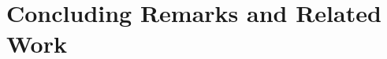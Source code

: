 \documentclass[runningheads]{llncs}
\begin{document}
\section{Concluding Remarks and Related Work}
\label{sec:relwork}




{}

%
%
%
%
%
\end{document}
